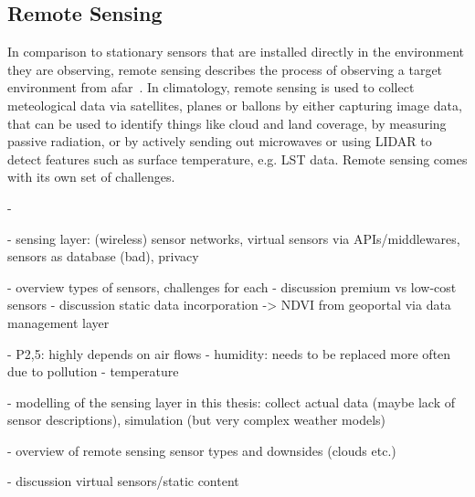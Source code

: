 
\subsection{Remote Sensing}

In comparison to stationary sensors that are installed directly in the environment they are observing, remote sensing describes the process of observing a target environment from afar~\cite{campbell2011introduction}. In climatology, remote sensing is used to collect meteological data via satellites, planes or ballons by either capturing image data, that can be used to identify things like cloud and land coverage, by measuring passive radiation, or by actively sending out microwaves or using LIDAR to detect features such as surface temperature, e.g. LST data. Remote sensing comes with its own set of challenges.


- 





- sensing layer: (wireless) sensor networks, virtual sensors via APIs/middlewares, sensors as database (bad), privacy

- overview types of sensors, challenges for each
- discussion premium vs low-cost sensors
- discussion static data incorporation -> NDVI from geoportal via data management layer

- P2,5: highly depends on air flows
- humidity: needs to be replaced more often due to pollution
- temperature

- modelling of the sensing layer in this thesis: collect actual data (maybe lack of sensor descriptions), simulation (but very complex weather models)

- overview of remote sensing sensor types and downsides (clouds etc.)

- discussion virtual sensors/static content


